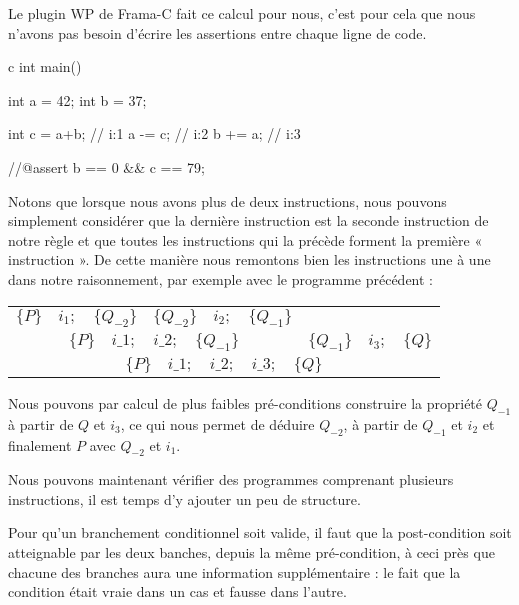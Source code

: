 Le plugin WP de Frama-C fait ce calcul pour nous, c'est pour cela que nous 
n'avons pas besoin d'écrire les assertions entre chaque ligne de code.



\begin{CodeBlock}{c}
int main(){
  int a = 42;
  int b = 37;

  int c = a+b; // i:1
  a -= c;      // i:2
  b += a;      // i:3

  //@assert b == 0 && c == 79;
}
\end{CodeBlock}





Notons que lorsque nous avons plus de deux instructions, nous pouvons simplement
considérer que la dernière instruction est la seconde instruction de notre règle
et que toutes les instructions qui la précède forment la première « instruction ». 
De cette manière nous remontons bien les instructions une à une dans notre
raisonnement, par exemple avec le programme précédent :


\begin{center}
\begin{tabular}{ccc}
  $\{P\}\quad i_1 ; \quad \{Q_{-2}\}$ & $\{Q_{-2}\}\quad i_2 ; \quad \{Q_{-1}\}$ & \\
  \cline{1-2}
  \multicolumn{2}{c}{$\{P\}\quad i\_1 ; \quad i\_2 ; \quad \{Q_{-1}\}$} & $\{Q_{-1}\} \quad i_3 ; \quad \{Q\}$\\
  \hline
  \multicolumn{3}{c}{$\{P\}\quad i\_1 ; \quad i\_2 ; \quad i\_3; \quad \{ Q \}$}
\end{tabular}
\end{center}

Nous pouvons par calcul de plus faibles pré-conditions construire la propriété
$Q_{-1}$ à partir de $Q$ et $i_3$, ce qui nous permet de déduire $Q_{-2}$, à 
partir de $Q_{-1}$ et $i_2$ et finalement $P$ avec $Q_{-2}$ et $i_1$.



Nous pouvons maintenant vérifier des programmes comprenant plusieurs 
instructions, il est temps d'y ajouter un peu de structure.





Pour qu'un branchement conditionnel soit valide, il faut que la post-condition
soit atteignable par les deux banches, depuis la même pré-condition, à ceci 
près que chacune des branches aura une information supplémentaire : le fait 
que la condition était vraie dans un cas et fausse dans l'autre.



